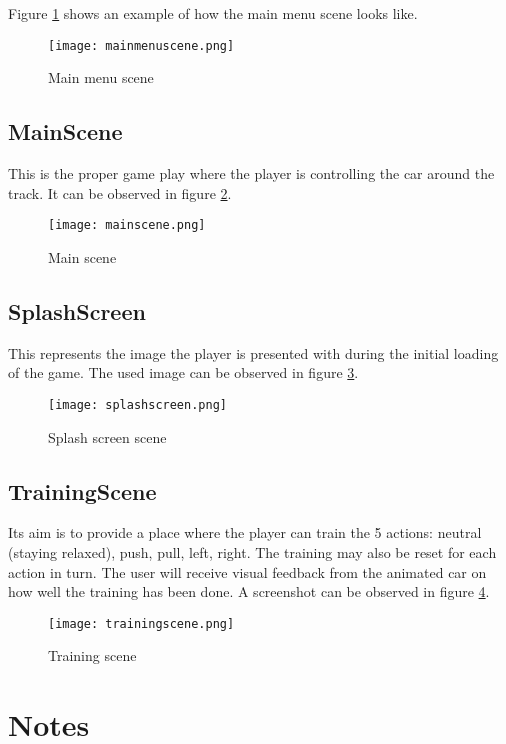 Figure \ref{fig:mainmenuscene} shows an example of how the main menu scene looks like.

\begin{figure}
  \centering
  \texttt{[image: mainmenuscene.png]}
  \caption{Main menu scene}
    \label{fig:mainmenuscene}           
\end{figure}

\subsection{MainScene}
This is the proper game play where the player is controlling the car around the track. It can be observed in figure \ref{fig:mainscene}.

\begin{figure}
  \centering
  \texttt{[image: mainscene.png]}
  \caption{Main scene}
    \label{fig:mainscene}           
\end{figure}

\subsection{SplashScreen}
This represents the image the player is presented with during the initial loading of the game. The used image can be observed in figure \ref{fig:splashscreenscene}.

\begin{figure}
  \centering
  \texttt{[image: splashscreen.png]}
  \caption{Splash screen scene}
    \label{fig:splashscreenscene}           
\end{figure}

\subsection{TrainingScene}
Its aim is to provide a place where the player can train the 5 actions: neutral (staying relaxed), push, pull, left, right. The training may also be reset for each action in turn. The user will receive visual feedback from the animated car on how well the training has been done. A screenshot can be observed in figure \ref{fig:trainingscene}.

\begin{figure}
  \centering
  \texttt{[image: trainingscene.png]}
  \caption{Training scene}
    \label{fig:trainingscene}           
\end{figure}

\section{Notes}

